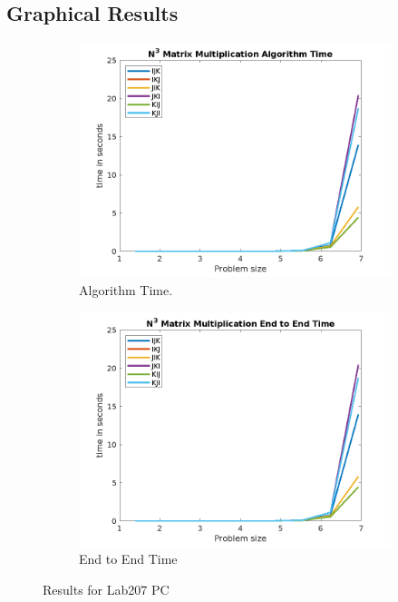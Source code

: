\documentclass[article, 11pt]{article}
\begin{document}
\subsection{Graphical Results}

\begin{figure}[h]
  \centering
  \begin{subfigure}[b]{0.45\textwidth}
    \includegraphics[width=\textwidth]{Q1_Algo_PC.png}
    \caption{Algorithm Time.}
    \label{fig:image1}
  \end{subfigure}
  \begin{subfigure}[b]{0.45\textwidth}
    \includegraphics[width=\textwidth]{Q1_EndtoEnd_PC.png}
    \caption{End to End Time}
    \label{fig:image2}
  \end{subfigure}
  \caption{Results for Lab207 PC}
  \label{fig:entire_figure}
\end{figure}
\end{document}
